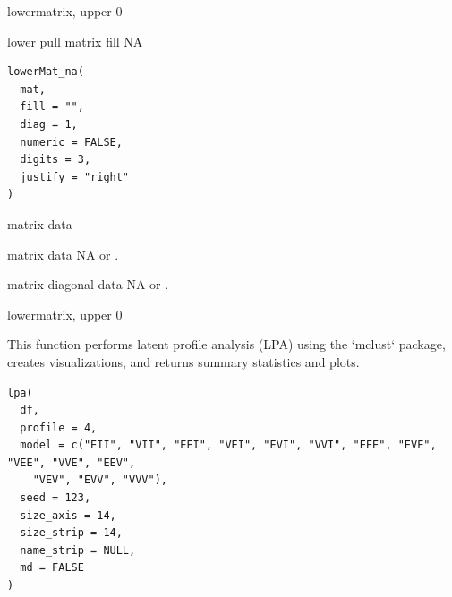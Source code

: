 \documentclass[a4paper]{book}
\begin{document}
%
\begin{Value}
lowermatrix, upper 0
\end{Value}
%
\begin{Description}
lower pull matrix fill NA
\end{Description}
%
\begin{Usage}
\begin{verbatim}
lowerMat_na(
  mat,
  fill = "",
  diag = 1,
  numeric = FALSE,
  digits = 3,
  justify = "right"
)
\end{verbatim}
\end{Usage}
%
\begin{Arguments}
\begin{ldescription}
\item[\code{mat}] matrix data

\item[\code{fill}] matrix data NA or .

\item[\code{diag}] matrix  diagonal data NA or .
\end{ldescription}
\end{Arguments}
%
\begin{Value}
lowermatrix, upper 0
\end{Value}
%
\begin{Description}
This function performs latent profile analysis (LPA) using the `mclust` package, creates visualizations,
and returns summary statistics and plots.
\end{Description}
%
\begin{Usage}
\begin{verbatim}
lpa(
  df,
  profile = 4,
  model = c("EII", "VII", "EEI", "VEI", "EVI", "VVI", "EEE", "EVE", "VEE", "VVE", "EEV",
    "VEV", "EVV", "VVV"),
  seed = 123,
  size_axis = 14,
  size_strip = 14,
  name_strip = NULL,
  md = FALSE
)
\end{verbatim}
\end{Usage}
%
\end{document}
